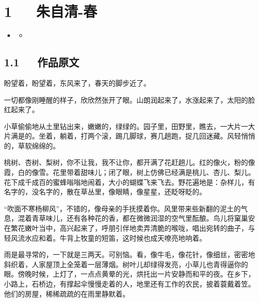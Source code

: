 \documentclass[letterpaper,12pt,english]{sphinxmanual}
\begin{document}
\chapter{1   朱自清-春}
\label{\detokenize{p01_u6563_u6587/_u6731_u81ea_u6e05-_u6625:id1}}\label{\detokenize{p01_u6563_u6587/_u6731_u81ea_u6e05-_u6625::doc}}
\begin{sphinxShadowBox}
\begin{itemize}
\item {} 
\label{\detokenize{p01_u6563_u6587/_u6731_u81ea_u6e05-_u6625:id4}}{\hyperref[\detokenize{p01_u6563_u6587/_u6731_u81ea_u6e05-_u6625:id1}]{}}
\begin{itemize}
\item {} 
\label{\detokenize{p01_u6563_u6587/_u6731_u81ea_u6e05-_u6625:id5}}{\hyperref[\detokenize{p01_u6563_u6587/_u6731_u81ea_u6e05-_u6625:id3}]{}}

\end{itemize}

\end{itemize}
\end{sphinxShadowBox}


\section{1.1   作品原文}
\label{\detokenize{p01_u6563_u6587/_u6731_u81ea_u6e05-_u6625:id3}}
盼望着，盼望着，东风来了，春天的脚步近了。

一切都像刚睡醒的样子，欣欣然张开了眼。山朗润起来了，水涨起来了，太阳的脸红起来了。

小草偷偷地从土里钻出来，嫩嫩的，绿绿的。园子里，田野里，瞧去，一大片一大片满是的。坐着，躺着，打两个滚，踢几脚球，赛几趟跑，捉几回迷藏。风轻悄悄的，草软绵绵的。

桃树、杏树、梨树，你不让我，我不让你，都开满了花赶趟儿。红的像火，粉的像霞，白的像雪。花里带着甜味儿；闭了眼，树上仿佛已经满是桃儿、杏儿、梨儿。花下成千成百的蜜蜂嗡嗡地闹着，大小的蝴蝶飞来飞去。野花遍地是：杂样儿，有名字的，没名字的，散在草丛里，像眼睛，像星星，还眨呀眨的。

“吹面不寒杨柳风”，不错的，像母亲的手抚摸着你。风里带来些新翻的泥土的气息，混着青草味儿，还有各种花的香，都在微微润湿的空气里酝酿。鸟儿将窠巢安在繁花嫩叶当中，高兴起来了，呼朋引伴地卖弄清脆的喉咙，唱出宛转的曲子，与轻风流水应和着。牛背上牧童的短笛，这时候也成天嘹亮地响着。

雨是最寻常的，一下就是三两天。可别恼。看，像牛毛，像花针，像细丝，密密地斜织着，人家屋顶上全笼着一层薄烟。树叶儿却绿得发亮，小草儿也青得逼你的眼。傍晚时候，上灯了，一点点黄晕的光，烘托出一片安静而和平的夜。在乡下，小路上，石桥边，有撑起伞慢慢走着的人，地里还有工作的农民，披着蓑戴着笠。他们的房屋，稀稀疏疏的在雨里静默着。
\end{document}
